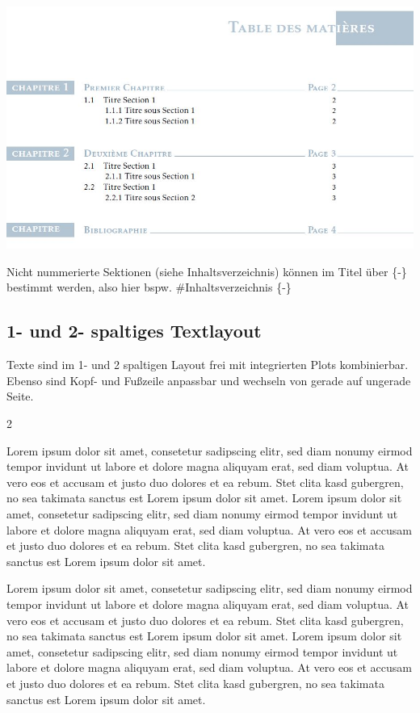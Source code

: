 \documentclass[
  a4paper,
  twoside]{article}
\begin{document}
\includegraphics{B8obV.jpg}

Nicht nummerierte Sektionen (siehe Inhaltsverzeichnis) können im Titel
über \{-\} bestimmt werden, also hier bspw. \#Inhaltsverzeichnis \{-\}

\newpage

\hypertarget{und-2--spaltiges-textlayout}{%
\subsection{1- und 2- spaltiges
Textlayout}\label{und-2--spaltiges-textlayout}}

Texte sind im 1- und 2 spaltigen Layout frei mit integrierten Plots
kombinierbar. Ebenso sind Kopf- und Fußzeile anpassbar und wechseln von
gerade auf ungerade Seite.

\begin {multicols}{2}

Lorem ipsum dolor sit amet, consetetur sadipscing elitr, sed diam nonumy
eirmod tempor invidunt ut labore et dolore magna aliquyam erat, sed diam
voluptua. At vero eos et accusam et justo duo dolores et ea rebum. Stet
clita kasd gubergren, no sea takimata sanctus est Lorem ipsum dolor sit
amet. Lorem ipsum dolor sit amet, consetetur sadipscing elitr, sed diam
nonumy eirmod tempor invidunt ut labore et dolore magna aliquyam erat,
sed diam voluptua. At vero eos et accusam et justo duo dolores et ea
rebum. Stet clita kasd gubergren, no sea takimata sanctus est Lorem
ipsum dolor sit amet.

\columnbreak

Lorem ipsum dolor sit amet, consetetur sadipscing elitr, sed diam nonumy
eirmod tempor invidunt ut labore et dolore magna aliquyam erat, sed diam
voluptua. At vero eos et accusam et justo duo dolores et ea rebum. Stet
clita kasd gubergren, no sea takimata sanctus est Lorem ipsum dolor sit
amet. Lorem ipsum dolor sit amet, consetetur sadipscing elitr, sed diam
nonumy eirmod tempor invidunt ut labore et dolore magna aliquyam erat,
sed diam voluptua. At vero eos et accusam et justo duo dolores et ea
rebum. Stet clita kasd gubergren, no sea takimata sanctus est Lorem
ipsum dolor sit amet.

\end {multicols}
\end{document}
